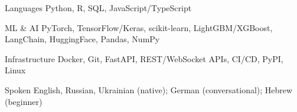 

\begin{cvskills}

  \cvskill
    {Languages} %
    {Python, R, SQL, JavaScript/TypeScript} %

  \cvskill
    {ML \& AI} %
    {PyTorch, TensorFlow/Keras, scikit-learn, LightGBM/XGBoost, LangChain, HuggingFace, Pandas, NumPy} %

  \cvskill
    {Infrastructure} %
    {Docker, Git, FastAPI, REST/WebSocket APIs, CI/CD, PyPI, Linux} %

  \cvskill
    {Spoken} %
    {English, Russian, Ukrainian (native); German (conversational); Hebrew (beginner)} %

\end{cvskills}
